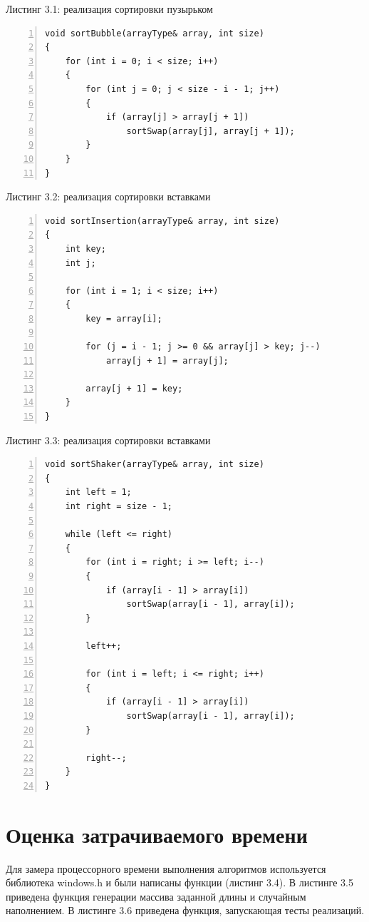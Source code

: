 \documentclass[12pt,a4paper]{report}
\begin{document}
\textrm{Листинг 3.1: реализация сортировки пузырьком}
\begin{lstlisting}[frame=single, numbers=left]
void sortBubble(arrayType& array, int size)
{
    for (int i = 0; i < size; i++)
    {
        for (int j = 0; j < size - i - 1; j++)
        {
            if (array[j] > array[j + 1])
                sortSwap(array[j], array[j + 1]);
        }
    }
}
\end{lstlisting}

\textrm{Листинг 3.2: реализация сортировки вставками}
\begin{lstlisting}[frame=single, numbers=left]
void sortInsertion(arrayType& array, int size)
{
    int key;
    int j;
    
    for (int i = 1; i < size; i++)
    {
        key = array[i];
    
        for (j = i - 1; j >= 0 && array[j] > key; j--)
            array[j + 1] = array[j];
    
        array[j + 1] = key;
    }
}
\end{lstlisting}

\textrm{Листинг 3.3: реализация сортировки вставками}
\begin{lstlisting}[frame=single, numbers=left]
void sortShaker(arrayType& array, int size)
{
    int left = 1;
    int right = size - 1;
    
    while (left <= right)
    {
        for (int i = right; i >= left; i--)
        {
            if (array[i - 1] > array[i])
                sortSwap(array[i - 1], array[i]);
        }
    
        left++;
    
        for (int i = left; i <= right; i++)
        {
            if (array[i - 1] > array[i])
                sortSwap(array[i - 1], array[i]);
        }
    
        right--;
    }
}
\end{lstlisting}

\section{Оценка затрачиваемого времени}

Для замера процессорного времени выполнения алгоритмов используется библиотека windows.h и были написаны функции 
(листинг 3.4). В листинге 3.5 приведена функция генерации массива заданной длины и случайным наполнением. В 
листинге 3.6 приведена функция, запускающая тесты реализаций.
\end{document}
